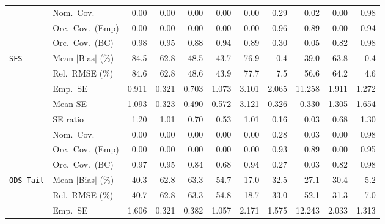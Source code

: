 \begin{landscape}
\begin{longtable}{llrrrrrrrrr}
 & Nom.\ Cov. & 0.00 & 0.00 & 0.00 & 0.00 & 0.00 & \cellcolor{ranktwo}0.29 & \cellcolor{rankthree}0.02 & 0.00 & \cellcolor{rankone}0.98 \\
 & Orc.\ Cov.\ (Emp) & \cellcolor{rankthree}0.00 & \cellcolor{rankthree}0.00 & \cellcolor{rankthree}0.00 & \cellcolor{rankthree}0.00 & \cellcolor{rankthree}0.00 & \cellcolor{rankone}0.96 & \cellcolor{ranktwo}0.89 & \cellcolor{rankthree}0.00 & \cellcolor{rankone}0.94 \\
 & Orc.\ Cov.\ (BC) & \cellcolor{rankthree}0.98 & \cellcolor{rankone}0.95 & 0.88 & \cellcolor{ranktwo}0.94 & 0.89 & 0.30 & 0.05 & 0.82 & \cellcolor{rankthree}0.98 \\
\addlinespace[2pt]
\quad \texttt{SFS} & Mean $|$Bias$|$ (\%) & 84.5 & 62.8 & 48.5 & \cellcolor{rankthree}43.7 & 76.9 & \cellcolor{rankone}0.4 & \cellcolor{ranktwo}39.0 & 63.8 & \cellcolor{rankone}0.4 \\
 & Rel.\ RMSE (\%) & 84.6 & 62.8 & 48.6 & \cellcolor{rankthree}43.9 & 77.7 & \cellcolor{ranktwo}7.5 & 56.6 & 64.2 & \cellcolor{rankone}4.6 \\
 & Emp.\ SE & 0.911 & 0.321 & 0.703 & 1.073 & 3.101 & 2.065 & 11.258 & 1.911 & 1.272 \\
 & Mean SE & 1.093 & 0.323 & 0.490 & 0.572 & 3.121 & 0.326 & 0.330 & 1.305 & 1.654 \\
 & SE ratio & \cellcolor{ranktwo}1.20 & \cellcolor{rankone}1.01 & \cellcolor{rankthree}0.70 & 0.53 & \cellcolor{rankone}1.01 & 0.16 & 0.03 & 0.68 & \cellcolor{rankthree}1.30 \\
 & Nom.\ Cov. & 0.00 & 0.00 & 0.00 & 0.00 & 0.00 & \cellcolor{ranktwo}0.28 & \cellcolor{rankthree}0.03 & 0.00 & \cellcolor{rankone}0.98 \\
 & Orc.\ Cov.\ (Emp) & 0.00 & 0.00 & 0.00 & 0.00 & 0.00 & \cellcolor{ranktwo}0.93 & \cellcolor{rankthree}0.89 & 0.00 & \cellcolor{rankone}0.95 \\
 & Orc.\ Cov.\ (BC) & \cellcolor{rankthree}0.97 & \cellcolor{rankone}0.95 & 0.84 & 0.68 & \cellcolor{ranktwo}0.94 & 0.27 & 0.03 & 0.82 & 0.98 \\
\addlinespace[2pt]
\quad \texttt{ODS-Tail} & Mean $|$Bias$|$ (\%) & 40.3 & 62.8 & 63.3 & 54.7 & \cellcolor{ranktwo}17.0 & 32.5 & \cellcolor{rankthree}27.1 & 30.4 & \cellcolor{rankone}5.2 \\
 & Rel.\ RMSE (\%) & 40.7 & 62.8 & 63.3 & 54.8 & \cellcolor{ranktwo}18.7 & 33.0 & 52.1 & \cellcolor{rankthree}31.3 & \cellcolor{rankone}7.0 \\
 & Emp.\ SE & 1.606 & 0.321 & 0.382 & 1.057 & 2.171 & 1.575 & 12.243 & 2.033 & 1.313 \\

\end{longtable}
\end{landscape}
